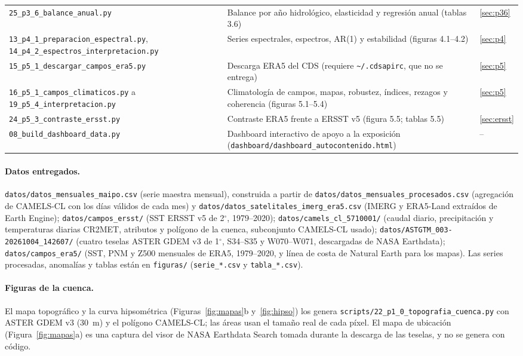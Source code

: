 \documentclass[11pt,a4paper]{article}
\newcommand{\archivo}[1]{\nolinkurl{#1}}
\begin{document}
\begin{table}[H]
\begin{tabularx}{\textwidth}{>{\raggedright\arraybackslash}p{4.9cm}>{\raggedright\arraybackslash}X>{\raggedright\arraybackslash}p{2.3cm}}
\archivo{25_p3_6_balance_anual.py} & Balance por año hidrológico, elasticidad y regresión anual (tablas 3.6) & \ref{sec:p36} \\
\archivo{13_p4_1_preparacion_espectral.py}, \archivo{14_p4_2_espectros_interpretacion.py} & Series espectrales, espectros, AR(1) y estabilidad (figuras 4.1--4.2) & \ref{sec:p4} \\
\archivo{15_p5_1_descargar_campos_era5.py} & Descarga ERA5 del CDS (requiere \archivo{~/.cdsapirc}, que no se entrega) & \ref{sec:p5} \\
\archivo{16_p5_1_campos_climaticos.py} a \archivo{19_p5_4_interpretacion.py} & Climatología de campos, mapas, robustez, índices, rezagos y coherencia (figuras 5.1--5.4) & \ref{sec:p5} \\
\archivo{24_p5_3_contraste_ersst.py} & Contraste ERA5 frente a ERSST v5 (figura 5.5; tablas 5.5) & \ref{sec:ersst} \\
\archivo{08_build_dashboard_data.py} & Dashboard interactivo de apoyo a la exposición (\archivo{dashboard/dashboard_autocontenido.html}) & -- \\
\bottomrule
\end{tabularx}
\end{table}

\paragraph{Datos entregados.} \archivo{datos/datos_mensuales_maipo.csv} (serie maestra mensual), construida a partir de \archivo{datos/datos_mensuales_procesados.csv} (agregación de CAMELS-CL con los días válidos de cada mes) y \archivo{datos/datos_satelitales_imerg_era5.csv} (IMERG y ERA5-Land extraídos de Earth Engine); \archivo{datos/campos_ersst/} (SST ERSST v5 de 2$^\circ$, 1979--2020); \archivo{datos/camels_cl_5710001/} (caudal diario, precipitación y temperaturas diarias CR2MET, atributos y polígono de la cuenca, subconjunto CAMELS-CL usado); \archivo{datos/ASTGTM_003-20261004_142607/} (cuatro teselas ASTER GDEM v3 de 1$^\circ$, S34--S35 y W070--W071, descargadas de NASA Earthdata); \archivo{datos/campos_era5/} (SST, PNM y Z500 mensuales de ERA5, 1979--2020, y línea de costa de Natural Earth para los mapas). Las series procesadas, anomalías y tablas están en \archivo{figuras/} (\texttt{serie\_*.csv} y \texttt{tabla\_*.csv}).

\paragraph{Figuras de la cuenca.} El mapa topográfico y la curva hipsométrica (Figuras~\ref{fig:mapas}b y~\ref{fig:hipso}) los genera \archivo{scripts/22_p1_0_topografia_cuenca.py} con ASTER GDEM v3 (30~m) y el polígono CAMELS-CL; las áreas usan el tamaño real de cada píxel. El mapa de ubicación (Figura~\ref{fig:mapas}a) es una captura del visor de NASA Earthdata Search tomada durante la descarga de las teselas, y no se genera con código.
\end{document}
